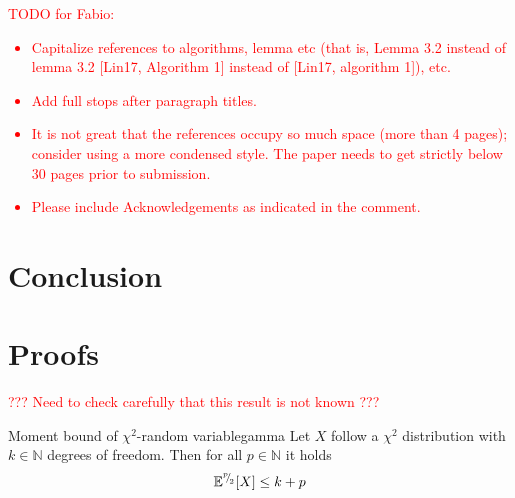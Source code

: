 \documentclass[12pt]{article}
\begin{document}
\textcolor{red}{TODO for Fabio:
\begin{itemize}
 \item Capitalize references to algorithms, lemma etc (that is, Lemma 3.2 instead of lemma 3.2 [Lin17, Algorithm 1] instead of [Lin17, algorithm 1]), etc.
 \item Add full stops after paragraph titles.
 \item It is not great that the references occupy so much space (more than 4 pages); consider using a more condensed style. The paper needs to get strictly below 30 pages prior to submission. 
 \item Please include Acknowledgements as indicated in the comment.
\end{itemize}
}
\color{blue}








\section{Conclusion}
\label{sec:conclusion}



%
\printbibliography

\appendix

\section{Proofs}

\textcolor{red}{??? Need to check carefully that this result is not known ???}

\begin{lemma}{Moment bound of $\chi^2$-random variable}{gamma}
    Let $X$ follow a $\chi^2$ distribution with $k \in \mathbb{N}$ degrees of freedom. Then for all $p \in \mathbb{N}$ it holds
    \begin{equation}
        \mathbb{E}^{{}^{p}{\mskip -5mu/\mskip -3mu}_{2}}[X] \leq k + p
    \end{equation}
\end{lemma}
\end{document}
